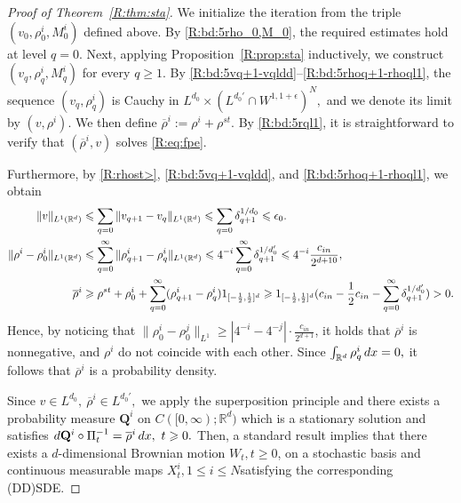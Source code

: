 \documentclass[10pt,a4paper]{amsart}
\numberwithin{equation}{section}
\def\dif{{\mathord{{\rm d}}}}
\def\geq{\geqslant}
\def\leq{\leqslant}
\def\dif{{\mathord{{\rm d}}}}
\def\geq{\geqslant}
\def\leq{\leqslant}
\begin{document}
 \begin{proof}[Proof of Theorem~\ref{R:thm:sta}]
We initialize the iteration from the triple
$
(v_0,\rho^i_0,M^i_0)
$
defined above.
By \eqref{R:bd:5rho_0,M_0}, the required estimates hold at level $q=0$.
Next, applying Proposition~\ref{R:prop:sta} inductively, we construct
$
(v_q,\rho^i_q,M^i_q)
$
for every
$
q\geq1.
$
By  
\eqref{R:bd:5vq+1-vqldd}--\eqref{R:bd:5rhoq+1-rhoql1}, the sequence
$
 (v_q,\rho^i_q) 
$
is Cauchy in
$
L^{d_0}\times (L^{d_0'}\cap W^{1,1+\epsilon})^N,
$
and we denote its limit by
$
(v,\rho^i).
$ We then define $\overline \rho^i:=\rho^i+\rho^{st}$.
By \eqref{R:bd:5rql1}, it is straightforward to verify that
$
(\overline \rho^i,v)
$
solves \eqref{R:eq:fpe}.

Furthermore, by \eqref{R:rhost>},  
\eqref{R:bd:5vq+1-vqldd}, and
\eqref{R:bd:5rhoq+1-rhoql1}, we obtain
\begin{align}
 \|v \|_{L^{1}(\mathbb{R}^d)}&\leq\sum_{q=0}  \|v_{q+1}-v_{q}\|_{L^{1}(\mathbb{R}^d)}\leq \sum_{q=0}\delta_{q+1}^{1/d_0}
 \leq \epsilon_0.\notag \\
\| \rho^i-\rho_0^i\|_{L^1(\mathbb{R}^d)} 
&\leq
\sum_{q=0}^\infty
\|\rho^i_{q+1}-\rho^i_q\|_{L^1(\mathbb{R}^d)}
\leq
 4^{-i}\sum_{q=0}^\infty
\delta_{q+1}^{1/d_0'}\leq 4^{-i} \frac{c_{in}}{2^{d+10}}
,
\notag\\
\overline\rho^i
&\geq \rho^{st}+
\rho^i_0
+
\sum_{q=0}^\infty
(\rho^i_{q+1}-\rho^i_q)1_{[-\frac12,\frac12]^d}
\geq
1_{[-\frac12,\frac12]^d}(c_{in}-\frac1 2 c_{in}
-
\sum_{q=0}^\infty
\delta_{q+1}^{1/d_0'})
>0.
\notag
\end{align}
Hence, by noticing that $\|\rho^i_0-\rho_0^j\|_{L^1}\geq |4^{-i}-4^{-j}|\cdot \frac{c_{in}}{2^{d+1}}$, it holds that $\overline \rho^i$ is nonnegative,  and $\rho^i$
 do not coincide with each other.
Since
$
\int_{\mathbb{R}^d}\rho_q^i\,\dif x=0,
$
it follows that $\overline\rho^i$ is a probability density.


Since
$
v\in L^{d_0},\ 
\overline \rho^i\in L^{d_0'},
$ we apply the superposition principle  \cite{Tre16}
 and there exists a probability measure
$
\mathbf{Q}^i
$
on
$
C([0,\infty);\mathbb{R}^d)
$
which is a stationary solution and satisfies
$
\dif \mathbf{Q}^i\circ\Pi_t^{-1}
=
\overline \rho^i\,\dif x,
\ 
t\geq0.$
Then,  a standard result  implies that there exists a $d$-dimensional Brownian motion $W_t,t\geq0$, on a stochastic basis  and   continuous  measurable maps $X^i_t,1  \leq i\leq N $satisfying the corresponding (DD)SDE.
\end{proof}
\end{document}

